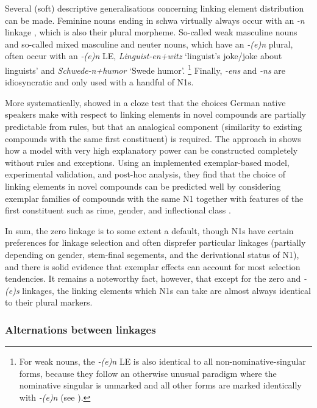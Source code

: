 Several (soft) descriptive generalisations concerning linking element distribution can be made.
Feminine nouns ending in schwa virtually always occur with an \textit{-n} linkage \parencite[32]{LibbenEa2002}, which is also their plural morpheme.
So-called weak masculine nouns and so-called mixed masculine and neuter nouns, which have an \textit{-(e)n} plural, often occur with an \textit{-(e)n} LE, \egg \textit{Linguist-en+witz} `linguist's joke\slash joke about linguists' and \textit{Schwede-n+humor} `Swede humor'.%
\footnote{For weak nouns, the \textit{-(e)n} LE is also identical to all non-nominative-singular forms, because they follow an otherwise unusual paradigm where the nominative singular is unmarked and all other forms are marked identically with \textit{-(e)n} (see \citealt{Koepcke1995,Schaefer2016c}).}
Finally, \textit{-ens} and \textit{-ns} are idiosyncratic and only used with a handful of N1s.

More systematically, \textcite{DresslerEa2001} showed in a cloze test that the choices German native speakers make with respect to linking elements in novel compounds are partially predictable from rules, but that an analogical component (similarity to existing compounds with the same first constituent) is required.
The approach in \textcite{KrottEa2007} shows how a model with very high explanatory power can be constructed completely without rules and exceptions.
Using an implemented exemplar-based model, experimental validation, and post-hoc analysis, they find that the choice of linking elements in novel compounds can be predicted well by considering exemplar families of compounds with the same N1 together with features of the first constituent such as rime, gender, and inflectional class \parencite[47]{KrottEa2007}.

In sum, the zero linkage is to some extent a default, though N1s have certain preferences for linkage selection and often disprefer particular linkages (partially depending on gender, stem-final segements, and the derivational status of N1), and there is solid evidence that exemplar effects can account for most selection tendencies.
It remains a noteworthy fact, however, that except for the zero and \textit{-(e)s} linkages, the linking elements which N1s can take are almost always identical to their plural markers.

\subsubsection{Alternations between linkages}


